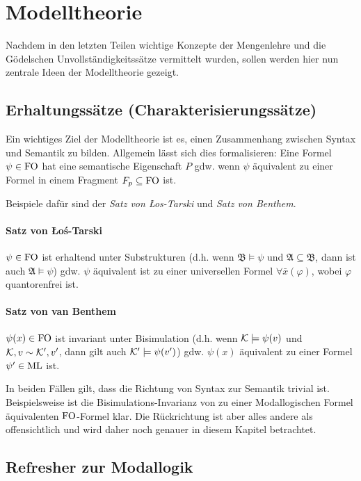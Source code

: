 \clearpage

\section{Modelltheorie}

Nachdem in den letzten Teilen wichtige Konzepte der Mengenlehre und die Gödelschen Unvollständigkeitssätze vermittelt wurden, sollen werden hier nun zentrale Ideen der Modelltheorie gezeigt.

\subsection{Erhaltungssätze (Charakterisierungssätze)}

Ein wichtiges Ziel der Modelltheorie ist es, einen Zusammenhang zwischen Syntax und Semantik zu bilden. Allgemein lässt sich dies formalisieren: Eine Formel $\psi\in \operatorname{FO}$ hat eine semantische Eigenschaft $P$ gdw. wenn $\psi$ äquivalent zu einer Formel in einem Fragment $F_p\subseteq \operatorname{FO}$ ist.

Beispiele dafür sind der \textit{Satz von \L os-Tarski} und \textit{Satz von Benthem}.

\paragraph{Satz von \L o\'{s}-Tarski}
$\psi\in \operatorname{FO}$ ist erhaltend unter Substrukturen (d.h. wenn $\mathfrak{B}\models \psi$ und $\mathfrak{A}\subseteq\mathfrak{B}$, dann ist auch $\mathfrak{A}\models\psi$) gdw. $\psi$ äquivalent ist zu einer universellen Formel $\forall \bar{x}(\varphi)$, wobei $\varphi$ quantorenfrei ist.

\paragraph{Satz von van Benthem}
$\psi(x)\in \operatorname{FO}$ ist invariant unter Bisimulation (d.h. wenn $\mathcal{K}\models \psi(v)$ und $\mathcal{K},v\sim \mathcal{K}',v'$, dann gilt auch $\mathcal{K}'\models \psi(v')$) gdw. $\psi(x)$ äquivalent zu einer Formel $\psi'\in \operatorname{ML}$ ist.

In beiden Fällen gilt, dass die Richtung von Syntax zur Semantik trivial ist. Beispielsweise ist die Bisimulations-Invarianz von zu einer Modallogischen Formel äquivalenten $\operatorname{FO}$-Formel klar. Die Rückrichtung ist aber alles andere als offensichtlich und wird daher noch genauer in diesem Kapitel betrachtet.

\subsection*{Refresher zur Modallogik}

